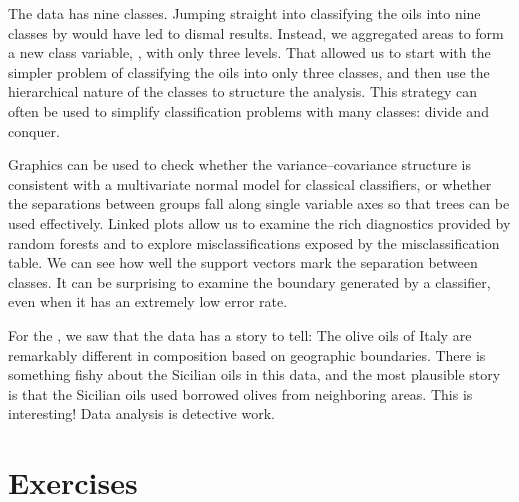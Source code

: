 
The  data has nine classes. Jumping straight into
classifying the oils into nine classes by  would have led to
dismal results.  Instead, we aggregated areas to form a new class
variable, , with only three levels.  That allowed us to
start with the simpler problem of classifying the oils into only three
classes, and then use the hierarchical nature of the classes to
structure the analysis.  This strategy can often be used to
simplify classification problems with many classes: divide and
conquer.

Graphics can be used to check whether the variance--covariance
structure is consistent with a multivariate normal model for classical
classifiers, or whether the separations between groups fall along
single variable axes so that trees can be used effectively. Linked
plots allow us to examine the rich diagnostics provided by random
forests and to explore misclassifications exposed by the
misclassification table. We can see how well the support vectors mark
the separation between classes. It can be surprising to examine the
boundary generated by a classifier, even when it has an extremely low
error rate.

For the , we saw that the data has a story to tell:
The olive oils of Italy are remarkably different in composition based
on geographic boundaries.  There is something fishy about the Sicilian
oils in this data, and the most plausible story is that the Sicilian
oils used borrowed olives from neighboring areas. This is interesting!
Data analysis is detective work.

\section*{Exercises}

